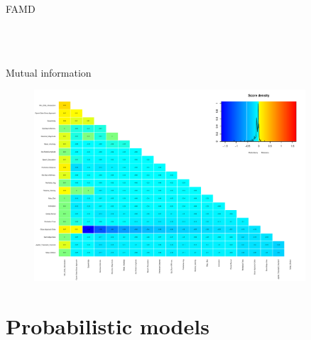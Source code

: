 \documentclass{beamer}
\begin{document}
\begin{frame}{FAMD}
\begin{columns}
\begin{figure}[h]
\begin{center}
\label{FAMD_Quantitative variables}
\end{center}
\end{figure}
\end{columns}
\end{frame}

\begin{frame}{Mutual information}
\begin{figure}
\begin{center}
\includegraphics[width=0.9\textwidth]{Pic/Mutual_information.pdf}
\label{Mutual_information}
\end{center}
\end{figure}
\end{frame}

\section{Probabilistic models}
\end{document}
